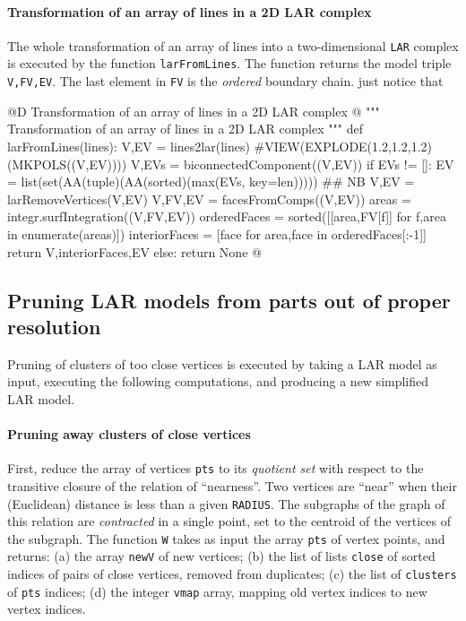 \documentclass[11pt,oneside]{article}    %
\begin{document}
\paragraph{Transformation of an array of lines in a 2D LAR complex}

The whole transformation of an array of lines into a two-dimensional \texttt{LAR} complex is executed by the function \texttt{larFromLines}. The function returns the model triple \texttt{V,FV,EV}. The last element in \texttt{FV} is the \emph{ordered} boundary chain. just notice that 


@D Transformation of an array of lines in a 2D LAR complex @{
""" Transformation of an array of lines in a 2D LAR complex """
def larFromLines(lines):
    V,EV = lines2lar(lines)
    #VIEW(EXPLODE(1.2,1.2,1.2)(MKPOLS((V,EV))))
    V,EVs = biconnectedComponent((V,EV))
    if EVs != []:
        EV = list(set(AA(tuple)(AA(sorted)(max(EVs, key=len)))))  ## NB
        V,EV = larRemoveVertices(V,EV)
        V,FV,EV = facesFromComps((V,EV))
        areas = integr.surfIntegration((V,FV,EV))
        orderedFaces = sorted([[area,FV[f]] for f,area in enumerate(areas)])
        interiorFaces = [face for area,face in orderedFaces[:-1]]
        return V,interiorFaces,EV
    else: return None
@}



\subsection{Pruning LAR models from parts out of proper resolution}

Pruning of clusters of too close vertices is executed by taking a LAR model as input, 
executing the following computations, and producing a new simplified LAR model.

\paragraph{Pruning away clusters of close vertices}
First, reduce the array of vertices \texttt{pts} to its \emph{quotient set} with respect to the transitive closure of the relation of ``nearness''. Two vertices are ``near'' when their (Euclidean) distance is less than a given \texttt{RADIUS}. The subgraphs of the graph of this relation are \emph{contracted} in a single point, set to the centroid of the vertices of the subgraph. The function \texttt{W} takes as input the array \texttt{pts} of vertex points, and returns: (a) the array \texttt{newV} of new vertices; (b) the list of lists \texttt{close} of sorted indices of pairs of close vertices, removed from duplicates; (c) the list of \texttt{clusters} of \texttt{pts} indices; (d) the integer  \texttt{vmap} array, mapping old vertex indices to new vertex indices.
\end{document}
